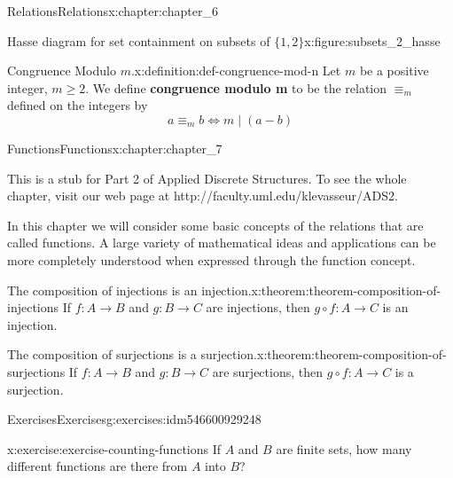 \documentclass[oneside,10pt,]{book}
\newcommand{\terminology}[1]{\textbf{#1}}
\numberwithin{equation}{section}
\begin{document}
\begin{chapterptx}{Relations}{}{Relations}{}{}{x:chapter:chapter_6}
\begin{figureptx}{Hasse diagram for set containment on subsets of \(\{1,2\}\)}{x:figure:subsets_2_hasse}{}
\begin{image}{0}{1}{0}
\end{image}%
\tcblower
\end{figureptx}%
\begin{definition}{Congruence Modulo \(m\).}{x:definition:def-congruence-mod-n}%
%
\label{g:notation:idm546600770928}%
Let \(m\) be a positive integer, \(m\geq 2\).  We define \terminology{congruence modulo m} to be the relation \(\equiv_m\) defined on the integers by%
\begin{equation*}
a \equiv_m b \Leftrightarrow m \mid (a-b)
\end{equation*}
%
\end{definition}
\end{chapterptx}
%
%
\typeout{************************************************}
\typeout{************************************************}
%
\begin{chapterptx}{Functions}{}{Functions}{}{}{x:chapter:chapter_7}
\begin{introduction}{}%
This is a stub for Part 2 of Applied Discrete Structures. To see the whole chapter, visit our web page at http:\slash{}\slash{}faculty.uml.edu\slash{}klevasseur\slash{}ADS2.%
\par
In this chapter we will consider some basic concepts of the relations that are called functions. A large variety of mathematical ideas and applications can be more completely understood when expressed through the function concept.%
\end{introduction}%
\begin{theorem}{The composition of injections is an injection.}{}{x:theorem:theorem-composition-of-injections}%
If \(f: A \rightarrow  B\) and \(g : B \rightarrow  C\) are injections, then \(g\circ f : A \rightarrow  C\) is an injection.%
\end{theorem}
\begin{theorem}{The composition of surjections is a surjection.}{}{x:theorem:theorem-composition-of-surjections}%
If \(f : A \rightarrow  B\) and \(g: B \rightarrow C\) are surjections, then \(g\circ f: A \rightarrow  C\) is a surjection.%
\end{theorem}
%
%
\typeout{************************************************}
\typeout{************************************************}
%
\begin{exercises-section}{Exercises}{}{Exercises}{}{}{g:exercises:idm546600929248}
\begin{divisionexercise}{7}{}{}{x:exercise:exercise-counting-functions}%
If \(A\) and \(B\) are finite sets, how many different functions are there from \(A\) into \(B\)?%
\end{divisionexercise}%
\end{exercises-section}
\end{chapterptx}
\end{document}
